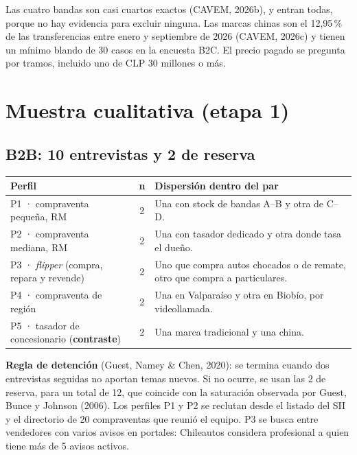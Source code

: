 \documentclass[11pt,a4paper]{article}
\begin{document}
Las cuatro bandas son casi cuartos exactos (CAVEM, 2026b), y entran todas, porque no hay evidencia para excluir ninguna. Las marcas chinas son el 12,95\,\% de las transferencias entre enero y septiembre de 2026 (CAVEM, 2026c) y tienen un mínimo blando de 30 casos en la encuesta B2C. El precio pagado se pregunta por tramos, incluido uno de CLP 30 millones o más.

\section{Muestra cualitativa (etapa 1)}

\subsection{B2B: 10 entrevistas y 2 de reserva}
\begin{center}\small
\begin{tabularx}{\textwidth}{@{}p{3.6cm}cL@{}}
\toprule
\textbf{Perfil} & \textbf{n} & \textbf{Dispersión dentro del par}\\
\midrule
P1 · compraventa pequeña, RM & 2 & Una con stock de bandas A–B y otra de C–D. \\
P2 · compraventa mediana, RM & 2 & Una con tasador dedicado y otra donde tasa el dueño. \\
P3 · \emph{flipper} (compra, repara y revende) & 2 & Uno que compra autos chocados o de remate, otro que compra a particulares. \\
P4 · compraventa de región & 2 & Una en Valparaíso y otra en Biobío, por videollamada. \\
P5 · tasador de concesionario (\textbf{contraste}) & 2 & Una marca tradicional y una china. \\
\bottomrule
\end{tabularx}
\end{center}

\textbf{Regla de detención} (Guest, Namey \& Chen, 2020): se termina cuando dos entrevistas seguidas no aportan temas nuevos. Si no ocurre, se usan las 2 de reserva, para un total de 12, que coincide con la saturación observada por Guest, Bunce y Johnson (2006). Los perfiles P1 y P2 se reclutan desde el listado del SII y el directorio de 20 compraventas que reunió el equipo. P3 se busca entre vendedores con varios avisos en portales: Chileautos considera profesional a quien tiene más de 5 avisos activos.
\end{document}
